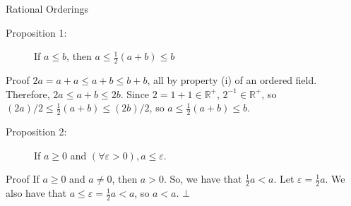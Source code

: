 \documentclass[8pt]{extarticle}
\newcommand{\R}{\mathbb{R}}
\begin{document}
  \begin{problem}{Rational Orderings}
    \begin{description}
      \item[Proposition 1:] If $a\leq b$, then $a\leq \frac{1}{2}(a+b) \leq b$
    \end{description}
    \begin{problem}{Proof}
      $2a = a+a \leq a+b \leq b+b$, all by property (i) of an ordered field.\\

      Therefore, $2a \leq a+b \leq 2b$. Since $2 = 1+1 \in \R^+$, $2^{-1}\in \R^+$, so $(2a)/2 \leq \frac{1}{2}(a+b) \leq (2b)/2$, so $a\leq \frac{1}{2}(a+b) \leq b$.
    \end{problem}
    \begin{description}
      \item[Proposition 2:] If $a\geq 0$ and $(\forall \varepsilon > 0), a\leq \varepsilon$.
    \end{description}
    \begin{problem}{Proof}
      If $a\geq 0$ and $a\neq 0$, then $a > 0$. So, we have that $\frac{1}{2}a < a$. Let $\varepsilon = \frac{1}{2}a$. We also have that $a \leq \varepsilon = \frac{1}{2}a < a$, so $a<a$. $\bot$
    \end{problem}
  \end{problem}
\end{document}
